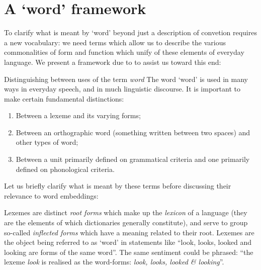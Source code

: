 \section{A `word' framework}
To clarify what is meant by `word' beyond just a description of convetion requires a new vocabulary: we need terms which allow us to describe the various commonalities of form and function which unify of these elements of everyday language. We present a framework due to \textcite{dixon02-word} to assist us toward this end:
\begin{infobox}{Distinguishing between uses of the term \emph{word} \parencite{dixon02-word}}
  The word `word' is used in many ways in everyday speech, and in much linguistic discourse. It is important to make certain fundamental distinctions:
  \begin{enumerate}[label=\protect\circled{\small{\arabic*}}]
    \item Between a lexeme and its varying forms;
    \item Between an orthographic word (something written between two spaces) and other types of word;
    \item Between a unit primarily defined on grammatical criteria and one primarily defined on phonological criteria.
  \end{enumerate}
\end{infobox}
Let us briefly clarify what is meant by these terms before discussing their relevance to word embeddings:
\begin{definition}
  Lexemes are distinct \emph{root forms} which make up the \emph{lexicon} of a language (they are the elements of which dictionaries generally constitute), and serve to group so-called \emph{inflected forms} which have a meaning related to their root. Lexemes are the object being referred to as `word' in statements like ``look, looks, looked and looking are forms of the same word''. The same sentiment could be phrased: ``the lexeme \emph{look} is realised as the word-forms: \emph{look, looks, looked \& looking}''.
\end{definition}
